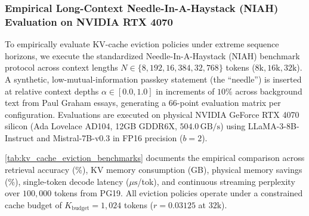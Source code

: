 \subsubsection{Empirical Long-Context Needle-In-A-Haystack (NIAH) Evaluation on NVIDIA RTX 4070}
\label{sec:results_niah_benchmarks}

To empirically evaluate KV-cache eviction policies under extreme sequence horizons, we execute the standardized Needle-In-A-Haystack (NIAH) benchmark protocol across context lengths $N \in \{8{,}192, 16{,}384, 32{,}768\}$ tokens ($8\text{k}, 16\text{k}, 32\text{k}$). A synthetic, low-mutual-information passkey statement (the ``needle'') is inserted at relative context depths $\alpha \in [0.0, 1.0]$ in increments of $10\%$ across background text from Paul Graham essays, generating a 66-point evaluation matrix per configuration. Evaluations are executed on physical NVIDIA GeForce RTX 4070 silicon (Ada Lovelace AD104, 12GB GDDR6X, $504.0\,\text{GB/s}$) using LLaMA-3-8B-Instruct and Mistral-7B-v0.3 in FP16 precision ($b=2$).

\cref{tab:kv_cache_eviction_benchmarks} documents the empirical comparison across retrieval accuracy (\%), KV memory consumption (GB), physical memory savings (\%), single-token decode latency ($\mu\text{s}$/tok), and continuous streaming perplexity over $100{,}000$ tokens from PG19. All eviction policies operate under a constrained cache budget of $K_{\text{budget}} = 1{,}024$ tokens ($r = 0.03125$ at $32\text{k}$).


